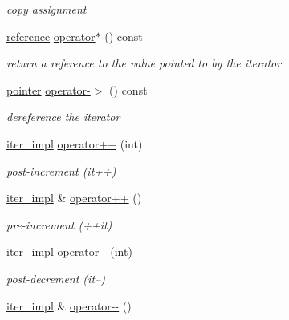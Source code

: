 \begin{DoxyCompactItemize}
\begin{DoxyCompactList}\small\item\em copy assignment \end{DoxyCompactList}\item 
\hyperlink{classnlohmann_1_1basic__json_1_1iter__impl_ae09599e9cb4a947020a0265c0c4f3d5e}{reference} \hyperlink{classnlohmann_1_1basic__json_1_1iter__impl_ae0a628811b09b9adea6d68c3a5c4ca2a}{operator$\ast$} () const
\begin{DoxyCompactList}\small\item\em return a reference to the value pointed to by the iterator \end{DoxyCompactList}\item 
\hyperlink{classnlohmann_1_1basic__json_1_1iter__impl_a3dddd7fa38b36e2531700ceb4a1ce9a8}{pointer} \hyperlink{classnlohmann_1_1basic__json_1_1iter__impl_afd0d209ef3a07a8aa3ee46e03538ffa6}{operator-\/$>$} () const
\begin{DoxyCompactList}\small\item\em dereference the iterator \end{DoxyCompactList}\item 
\hyperlink{classnlohmann_1_1basic__json_1_1iter__impl}{iter\+\_\+impl} \hyperlink{classnlohmann_1_1basic__json_1_1iter__impl_a74e26f187519bc7181b825b8f38a4e93}{operator++} (int)
\begin{DoxyCompactList}\small\item\em post-\/increment (it++) \end{DoxyCompactList}\item 
\hyperlink{classnlohmann_1_1basic__json_1_1iter__impl}{iter\+\_\+impl} \& \hyperlink{classnlohmann_1_1basic__json_1_1iter__impl_a60e2723dae1c6d537fc914c664f1a81c}{operator++} ()
\begin{DoxyCompactList}\small\item\em pre-\/increment (++it) \end{DoxyCompactList}\item 
\hyperlink{classnlohmann_1_1basic__json_1_1iter__impl}{iter\+\_\+impl} \hyperlink{classnlohmann_1_1basic__json_1_1iter__impl_a0c3a102ac61d4c6f869fe9a5d065e91e}{operator-\/-\/} (int)
\begin{DoxyCompactList}\small\item\em post-\/decrement (it--) \end{DoxyCompactList}\item 
\hyperlink{classnlohmann_1_1basic__json_1_1iter__impl}{iter\+\_\+impl} \& \hyperlink{classnlohmann_1_1basic__json_1_1iter__impl_a50c5d20f733bfe2b13d67366102ba3fe}{operator-\/-\/} ()

\end{DoxyCompactItemize}
